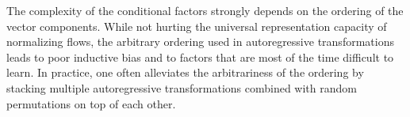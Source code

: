 \documentclass[twoside]{article}
\begin{document}
The complexity of the conditional factors  strongly depends on the ordering of the vector components. While not hurting the universal representation capacity of normalizing flows, the arbitrary ordering used in autoregressive transformations leads to poor inductive bias and to factors that are most of the time difficult to learn.
In practice, one often alleviates the arbitrariness of the ordering by stacking multiple autoregressive transformations combined with random permutations on top of each other. %

%
\end{document}
